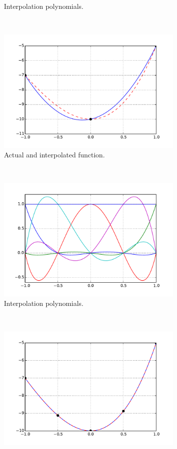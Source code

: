 \begin{figure}[H]
\begin{subfigure}[b]{0.45\textwidth}
		\caption{Interpolation polynomials.}
	\end{subfigure}\,
%
	\begin{subfigure}[b]{0.45\textwidth}\qquad
		\includegraphics[width=\textwidth]{interqua.pdf}
		\caption{Actual and interpolated function.}
	\end{subfigure}\\
%
\centering
	\begin{subfigure}[b]{0.45\textwidth}\qquad
		\includegraphics[width=\textwidth]{third.pdf}
		\caption{Interpolation polynomials.}
	\end{subfigure}\,
%
	\begin{subfigure}[b]{0.45\textwidth}\qquad
		\includegraphics[width=\textwidth]{intertri.pdf}

\end{subfigure}
\end{figure}
